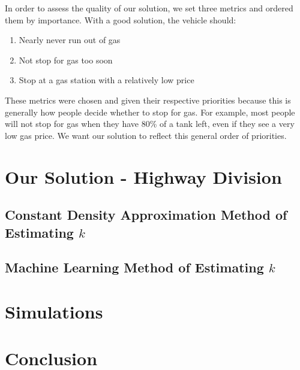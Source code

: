\documentclass[conference]{IEEEtran}
\theoremstyle{definition}
\begin{document}
In order to assess the quality of our solution, we set three metrics and ordered them by importance. With a good solution, the vehicle should: \label{metrics}

\begin{enumerate}
\item Nearly never run out of gas
\item Not stop for gas too soon
\item Stop at a gas station with a relatively low price
\end{enumerate}

These metrics were chosen and given their respective priorities because this is generally how people decide whether to stop for gas. For example, most people will not stop for gas when they have 80\% of a tank left, even if they see a very low gas price. We want our solution to reflect this general order of priorities.

\section{Our Solution - Highway Division} \label{sec:solution}




\subsection{Constant Density Approximation Method of Estimating $k$}


\subsection{Machine Learning Method of Estimating $k$}


\section{Simulations} \label{sec:simulations}




\section{Conclusion} \label{sec:conclusion}



\end{document}
